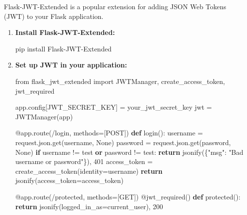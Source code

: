 \documentclass[
  letterpaper,
  DIV=11,
  numbers=noendperiod]{scrreprt}
\newenvironment{Shaded}{\begin{snugshade}}{\end{snugshade}}
\newcommand{\AttributeTok}[1]{\textcolor[rgb]{0.40,0.45,0.13}{#1}}
\newcommand{\ControlFlowTok}[1]{\textcolor[rgb]{0.00,0.23,0.31}{\textbf{#1}}}
\newcommand{\DecValTok}[1]{\textcolor[rgb]{0.68,0.00,0.00}{#1}}
\newcommand{\ExtensionTok}[1]{\textcolor[rgb]{0.00,0.23,0.31}{#1}}
\newcommand{\ImportTok}[1]{\textcolor[rgb]{0.00,0.46,0.62}{#1}}
\newcommand{\KeywordTok}[1]{\textcolor[rgb]{0.00,0.23,0.31}{\textbf{#1}}}
\newcommand{\NormalTok}[1]{\textcolor[rgb]{0.00,0.23,0.31}{#1}}
\newcommand{\OperatorTok}[1]{\textcolor[rgb]{0.37,0.37,0.37}{#1}}
\newcommand{\StringTok}[1]{\textcolor[rgb]{0.13,0.47,0.30}{#1}}
\newcommand{\VariableTok}[1]{\textcolor[rgb]{0.07,0.07,0.07}{#1}}
\begin{document}
Flask-JWT-Extended is a popular extension for adding JSON Web Tokens
(JWT) to your Flask application.

\begin{enumerate}
\def\labelenumi{\arabic{enumi}.}
\item
  \textbf{Install Flask-JWT-Extended:}

\begin{Shaded}
\begin{Highlighting}[]
\ExtensionTok{pip}\NormalTok{ install Flask{-}JWT{-}Extended}
\end{Highlighting}
\end{Shaded}
\item
  \textbf{Set up JWT in your application:}

\begin{Shaded}
\begin{Highlighting}[]
\ImportTok{from}\NormalTok{ flask\_jwt\_extended }\ImportTok{import}\NormalTok{ JWTManager, create\_access\_token, jwt\_required}

\NormalTok{app.config[}\StringTok{\textquotesingle{}JWT\_SECRET\_KEY\textquotesingle{}}\NormalTok{] }\OperatorTok{=} \StringTok{\textquotesingle{}your\_jwt\_secret\_key\textquotesingle{}}
\NormalTok{jwt }\OperatorTok{=}\NormalTok{ JWTManager(app)}

\AttributeTok{@app.route}\NormalTok{(}\StringTok{\textquotesingle{}/login\textquotesingle{}}\NormalTok{, methods}\OperatorTok{=}\NormalTok{[}\StringTok{\textquotesingle{}POST\textquotesingle{}}\NormalTok{])}
\KeywordTok{def}\NormalTok{ login():}
\NormalTok{    username }\OperatorTok{=}\NormalTok{ request.json.get(}\StringTok{\textquotesingle{}username\textquotesingle{}}\NormalTok{, }\VariableTok{None}\NormalTok{)}
\NormalTok{    password }\OperatorTok{=}\NormalTok{ request.json.get(}\StringTok{\textquotesingle{}password\textquotesingle{}}\NormalTok{, }\VariableTok{None}\NormalTok{)}
    \ControlFlowTok{if}\NormalTok{ username }\OperatorTok{!=} \StringTok{\textquotesingle{}test\textquotesingle{}} \KeywordTok{or}\NormalTok{ password }\OperatorTok{!=} \StringTok{\textquotesingle{}test\textquotesingle{}}\NormalTok{:}
        \ControlFlowTok{return}\NormalTok{ jsonify(\{}\StringTok{"msg"}\NormalTok{: }\StringTok{"Bad username or password"}\NormalTok{\}), }\DecValTok{401}
\NormalTok{    access\_token }\OperatorTok{=}\NormalTok{ create\_access\_token(identity}\OperatorTok{=}\NormalTok{username)}
    \ControlFlowTok{return}\NormalTok{ jsonify(access\_token}\OperatorTok{=}\NormalTok{access\_token)}

\AttributeTok{@app.route}\NormalTok{(}\StringTok{\textquotesingle{}/protected\textquotesingle{}}\NormalTok{, methods}\OperatorTok{=}\NormalTok{[}\StringTok{\textquotesingle{}GET\textquotesingle{}}\NormalTok{])}
\AttributeTok{@jwt\_required}\NormalTok{()}
\KeywordTok{def}\NormalTok{ protected():}
    \ControlFlowTok{return}\NormalTok{ jsonify(logged\_in\_as}\OperatorTok{=}\NormalTok{current\_user), }\DecValTok{200}
\end{Highlighting}
\end{Shaded}
\end{enumerate}
\end{document}
